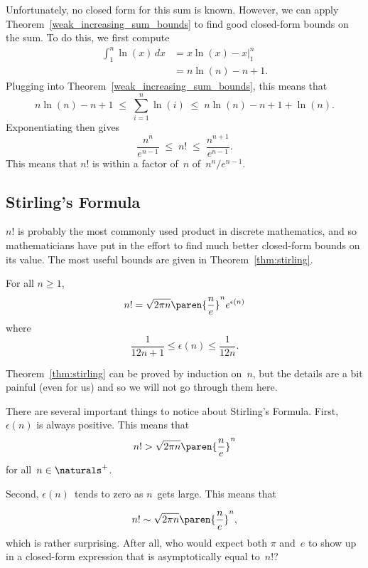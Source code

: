 Unfortunately, no closed form for this sum is known.  However, we can
apply Theorem~\ref{weak_increasing_sum_bounds} to find good closed-form bounds on the
sum.  To do this, we first compute
\begin{align*}
\int_1^n \ln(x) \, dx
    &= x \ln(x) - x \Bigr|_1^n \\
    &= n \ln(n) - n + 1.
\end{align*}
Plugging into Theorem~\ref{weak_increasing_sum_bounds}, this means that
\[
    n \ln(n) - n + 1
    \;\le\; \sum_{i = 1}^n \ln(i)
    \;\le\; n \ln(n) - n + 1 + \ln(n).
\]
Exponentiating then gives
\begin{equation}\label{eqn:9Q1}
    \frac{n^n}{e^{n - 1}} \;\le\; n! \;\le\; \frac{n^{n + 1}}{e^{n - 1}}.
\end{equation}
This means that $n!$ is within a factor of~$n$ of~$n^n/e^{n - 1}$.

\subsection{Stirling's Formula}

$n!$ is probably the most commonly used product in discrete
mathematics, and so mathematicians have put in the effort to find much
better closed-form bounds on its value.  The most useful bounds are
given in Theorem~\ref{thm:stirling}.

\begin{theorem}\label{thm:stirling}
For all $n \ge 1$,
\[
    n! = \sqrt{2 \pi n} \paren{\frac{n}{e}}^n e^{\epsilon(n)}
\]
where
\[
    \frac{1}{12 n + 1} \le \epsilon(n) \le \frac{1}{12n}.
\]
\end{theorem}

Theorem~\ref{thm:stirling} can be proved by induction on~$n$, but the
details are a bit painful (even for us) and so we will not go through
them here.

There are several important things to notice about Stirling's
Formula.  First, $\epsilon(n)$ is always positive.  This means that
\begin{equation}\label{eqn:9ZA}
    n! > \sqrt{2\pi n} \paren{\frac{n}{e}}^n
\end{equation}
for all~$n \in \naturals^+$.

Second, $\epsilon(n)$~tends to zero as $n$~gets large.  This means
that
\iffalse
\footnote{The $\sim$ notation was defined in
  Section~\ref{sec:asymptotic_equality}.}
\fi
\begin{equation}\label{eqn:9.28}
    n! \sim \sqrt{2\pi n} \paren{\frac{n}{e}}^n,
\end{equation}
which is rather surprising.  After all, who would expect both $\pi$
and~$e$ to show up in a closed-form expression that is asymptotically
equal to~$n!$?

